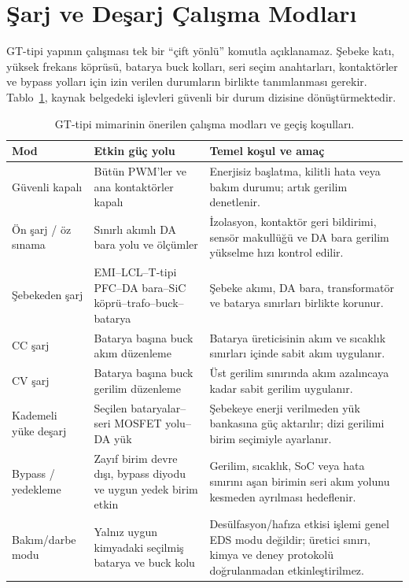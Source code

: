 \section{Şarj ve Deşarj Çalışma Modları}
\label{sec:gt-modlar}

GT-tipi yapının çalışması tek bir ``çift yönlü'' komutla açıklanamaz. Şebeke katı, yüksek frekans köprüsü, batarya buck kolları, seri seçim anahtarları, kontaktörler ve bypass yolları için izin verilen durumların birlikte tanımlanması gerekir. Tablo~\ref{tab:gt-calisma-modlari}, kaynak belgedeki işlevleri güvenli bir durum dizisine dönüştürmektedir.

\begin{table}[H]
  \centering
  \caption{GT-tipi mimarinin önerilen çalışma modları ve geçiş koşulları.}
  \label{tab:gt-calisma-modlari}
  \small
  \begin{tabularx}{\textwidth}{@{}p{}p{}X@{}}
    \toprule
    Mod & Etkin güç yolu & Temel koşul ve amaç \\
    \midrule
    Güvenli kapalı & Bütün PWM'ler ve ana kontaktörler kapalı & Enerjisiz başlatma, kilitli hata veya bakım durumu; artık gerilim denetlenir. \\
    Ön şarj / öz sınama & Sınırlı akımlı DA bara yolu ve ölçümler & İzolasyon, kontaktör geri bildirimi, sensör makullüğü ve DA bara gerilim yükselme hızı kontrol edilir. \\
    Şebekeden şarj & EMI--LCL--T-tipi PFC--DA bara--SiC köprü--trafo--buck--batarya & Şebeke akımı, DA bara, transformatör ve batarya sınırları birlikte korunur. \\
    CC şarj & Batarya başına buck akım düzenleme & Batarya üreticisinin akım ve sıcaklık sınırları içinde sabit akım uygulanır. \\
    CV şarj & Batarya başına buck gerilim düzenleme & Üst gerilim sınırında akım azalıncaya kadar sabit gerilim uygulanır. \\
    Kademeli yüke deşarj & Seçilen bataryalar--seri MOSFET yolu--DA yük & Şebekeye enerji verilmeden yük bankasına güç aktarılır; dizi gerilimi birim seçimiyle ayarlanır. \\
    Bypass / yedekleme & Zayıf birim devre dışı, bypass diyodu ve uygun yedek birim etkin & Gerilim, sıcaklık, SoC veya hata sınırını aşan birimin seri akım yolunu kesmeden ayrılması hedeflenir. \\
    Bakım/darbe modu & Yalnız uygun kimyadaki seçilmiş batarya ve buck kolu & Desülfasyon/hafıza etkisi işlemi genel EDS modu değildir; üretici sınırı, kimya ve deney protokolü doğrulanmadan etkinleştirilmez. \\
    \bottomrule
  \end{tabularx}
\end{table}

